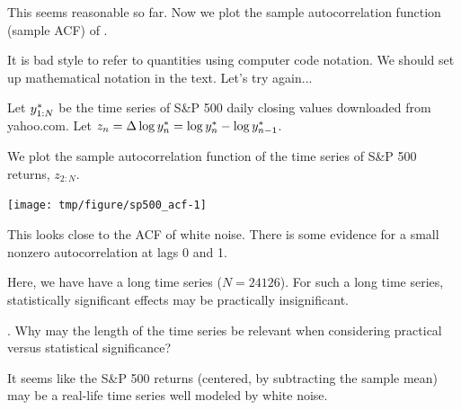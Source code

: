 \begin{frame}[fragile]


\bi
\item This seems reasonable so far. Now we plot the sample autocorrelation function (sample ACF) of . 

\item It is bad style to refer to quantities using computer code notation. We should set up mathematical notation in the text. Let's try again...

\item Let $y_{1:N}^*$ be the time series of S\&P 500 daily closing values downloaded from yahoo.com.  Let $z_n= \Delta \log y_n^* = \log y_{n}^*-\log y_{n-1}^*$. 

\item We plot the sample autocorrelation function of the time series of S\&P 500 returns, ${z_{2:N}}$.
\begin{knitrout}\small
{}\color{fgcolor}\begin{kframe}
\begin{alltt}
 \hlkwb{<-} \hlstd{(}
\end{alltt}
\end{kframe}
\end{knitrout}
\ei
\vspace{-1mm}

\begin{knitrout}\small
{}\color{fgcolor}

{\centering \texttt{[image: tmp/figure/sp500\_acf-1]} 

}


\end{knitrout}

\end{frame}

\begin{frame}[fragile]
\bi
\item This looks close to the ACF of white noise. There is some evidence for a small nonzero autocorrelation at lags 0 and 1. 

\item Here, we have have a long time series ($N=24126$). For such a long time series, statistically significant effects may be practically insignificant. 
 
\ei

\myquestion. Why may the length of the time series be relevant when considering practical versus statistical significance? 


\bi
\item It seems like the S\&P 500 returns (centered, by subtracting the sample mean) may be a real-life time series well modeled by white noise.
\ei

\end{frame} 


